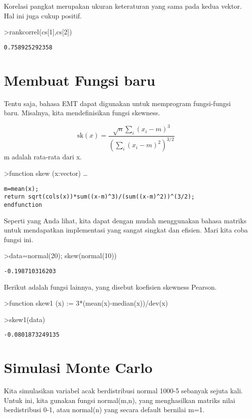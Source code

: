 \documentclass[
]{book}
\begin{document}
Korelasi pangkat merupakan ukuran keteraturan yang sama pada kedua vektor. Hal ini juga cukup positif.

\textgreater rankcorrel(cs{[}1{]},cs{[}2{]})

\begin{verbatim}
0.758925292358
\end{verbatim}

\chapter{Membuat Fungsi baru}\label{membuat-fungsi-baru}

Tentu saja, bahasa EMT dapat digunakan untuk memprogram fungsi-fungsi baru. Misalnya, kita mendefinisikan fungsi skewness.

\[\text{sk}(x) = \dfrac{\sqrt{n} \sum_i (x_i-m)^3}{\left(\sum_i (x_i-m)^2\right)^{3/2}}\]m adalah rata-rata dari x.

\textgreater function skew (x:vector) \ldots{}

\begin{verbatim}
m=mean(x);
return sqrt(cols(x))*sum((x-m)^3)/(sum((x-m)^2))^(3/2);
endfunction
\end{verbatim}

Seperti yang Anda lihat, kita dapat dengan mudah menggunakan bahasa matriks untuk mendapatkan implementasi yang sangat singkat dan efisien. Mari kita coba fungsi ini.

\textgreater data=normal(20); skew(normal(10))

\begin{verbatim}
-0.198710316203
\end{verbatim}

Berikut adalah fungsi lainnya, yang disebut koefisien skewness Pearson.

\textgreater function skew1 (x) := 3*(mean(x)-median(x))/dev(x)

\textgreater skew1(data)

\begin{verbatim}
-0.0801873249135
\end{verbatim}

\chapter{Simulasi Monte Carlo}\label{simulasi-monte-carlo}

Kita simulasikan variabel acak berdistribusi normal 1000-5 sebanyak sejuta kali. Untuk ini, kita gunakan fungsi normal(m,n), yang menghasilkan matriks nilai berdistribusi 0-1, atau normal(n) yang secara default bernilai m=1.
\end{document}
